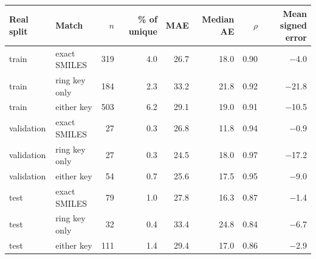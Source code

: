 \begin{tabular}{@{}llrrrrrr@{}}
\toprule
Real split & Match & $n$ & \% of unique & MAE & Median AE & $\rho$ & Mean signed error \\
\midrule
train & exact SMILES & 319 & 4.0 & 26.7 & 18.0 & 0.90 & \num{-4.0} \\
train & ring key only & 184 & 2.3 & 33.2 & 21.8 & 0.92 & \num{-21.8} \\
train & either key & 503 & 6.2 & 29.1 & 19.0 & 0.91 & \num{-10.5} \\
validation & exact SMILES & 27 & 0.3 & 26.8 & 11.8 & 0.94 & \num{-0.9} \\
validation & ring key only & 27 & 0.3 & 24.5 & 18.0 & 0.97 & \num{-17.2} \\
validation & either key & 54 & 0.7 & 25.6 & 17.5 & 0.95 & \num{-9.0} \\
test & exact SMILES & 79 & 1.0 & 27.8 & 16.3 & 0.87 & \num{-1.4} \\
test & ring key only & 32 & 0.4 & 33.4 & 24.8 & 0.84 & \num{-6.7} \\
test & either key & 111 & 1.4 & 29.4 & 17.0 & 0.86 & \num{-2.9} \\
\bottomrule
\end{tabular}

